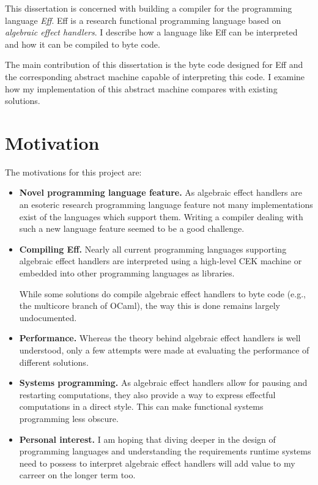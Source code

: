 \documentclass[class=article,crop=false,11pt]{standalone}
\begin{document}
This dissertation is concerned with building a compiler for the programming 
language \emph{Eff}. Eff is a research functional programming language based 
on \emph{algebraic effect handlers}. I describe how a language like Eff can 
be interpreted and how it can be compiled to byte code.

The main contribution of this dissertation is the byte code designed for Eff
and the corresponding abstract machine capable of interpreting this code. I 
examine how my implementation of this abstract machine compares with 
existing solutions.

\section{Motivation}
The motivations for this project are:
\begin{itemize}
\item \textbf{Novel programming language feature.} 
As algebraic effect handlers are an esoteric research programming language
feature not many implementations exist of the languages which support them.
Writing a compiler dealing with such a new language feature seemed to be a
good challenge.

\item \textbf{Compiling Eff.}
Nearly all current programming languages supporting algebraic effect handlers
are interpreted using a high-level CEK machine or embedded into other
programming languages as libraries.

While some solutions do compile algebraic effect handlers to byte code (e.g.,
the multicore branch of OCaml), the way this is done remains largely
undocumented.

\item \textbf{Performance.}
Whereas the theory behind algebraic effect handlers is well understood, only a
few attempts were made at evaluating the performance of different solutions.

\item \textbf{Systems programming.}
As algebraic effect handlers allow for pausing and restarting computations, they
also provide a way to express effectful computations in a direct style.
This can make functional systems programming less obscure.

\item \textbf{Personal interest.}
I am hoping that diving deeper in the design of programming languages and
understanding the requirements runtime systems need to possess to interpret
algebraic effect handlers  will add value to my carreer on the longer term too.

\end{itemize}
\end{document}
